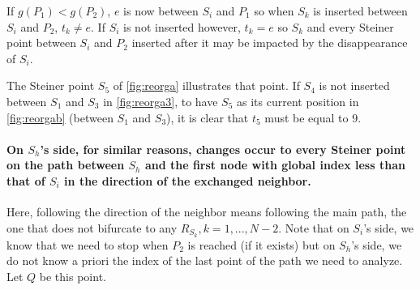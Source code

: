 \documentclass{article}
\theoremstyle{plain}
\begin{document}
If $g(P_1) < g(P_2)$, $e$ is now between $S_i$ and $P_1$ so when $S_k$ is inserted between $S_i$ and $P_2$, $t_k \neq e$. If $S_i$ is not inserted however, $t_k = e$ so $S_k$ and every Steiner point between $S_i$ and $P_2$ inserted after it may be impacted by the disappearance of $S_i$.

The Steiner point $S_5$ of \cref{fig:reorga} illustrates that point. 
If $S_4$ is not inserted between $S_1$ and $S_3$ in \cref{fig:reorga3}, to have $S_5$ as its current position in \cref{fig:reorgab} (between $S_1$ and $S_3$), it is clear that $t_5$ must be equal to $9$.

\paragraph{On $S_h$'s side, for similar reasons, changes occur to every Steiner point on the path between $S_h$ and the first node with global index less than that of $S_i$ in the direction of the exchanged neighbor.}
Here, following the direction of the neighbor means following the main path, the one that does not bifurcate to any $R_{S_k}, k=1,...,N-2$. 
Note that on $S_i$'s side, we know that we need to stop when $P_2$ is reached (if it exists) but on $S_h$'s side, we do not know a priori the index of the last point of the path we need to analyze. Let $Q$ be this point.
\end{document}
